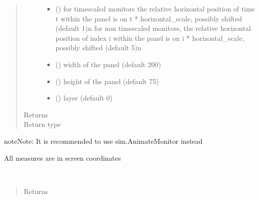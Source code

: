 \documentclass[letterpaper,10pt,english]{sphinxmanual}
\begin{document}
\begin{fulllineitems}
\begin{fulllineitems}
\begin{quote}
\begin{description}
\begin{itemize}
\item {} 
 () \textendash{} for timescaled monitors the relative horizontal position of time t within the panel is on
t * horizontal\_scale, possibly shifted (default 1)\textbar{}n\textbar{}
for non timescaled monitors, the relative horizontal position of index i within the panel is on
i * horizontal\_scale, possibly shifted (default 5)\textbar{}n\textbar{}

\item {} 
 () \textendash{} width of the panel (default 200)

\item {} 
 () \textendash{} height of the panel (default 75)

\item {} 
 () \textendash{} layer (default 0)

\end{itemize}

\item[{Returns}] \leavevmode
{}

\item[{Return type}] \leavevmode
{\hyperref[\detokenize{Reference:salabim.AnimateMonitor}]{}}

\end{description}\end{quote}

\begin{sphinxadmonition}{note}{Note:}
It is recommended to use sim.AnimateMonitor instead 

All measures are in screen coordinates 
\end{sphinxadmonition}

\end{fulllineitems}


\begin{fulllineitems}
\label{\detokenize{Reference:salabim.Monitor.base_name}}~\begin{quote}\begin{description}
\item[{Returns}] \leavevmode
{}


\end{description}
\end{quote}
\end{fulllineitems}
\end{fulllineitems}
\end{document}
